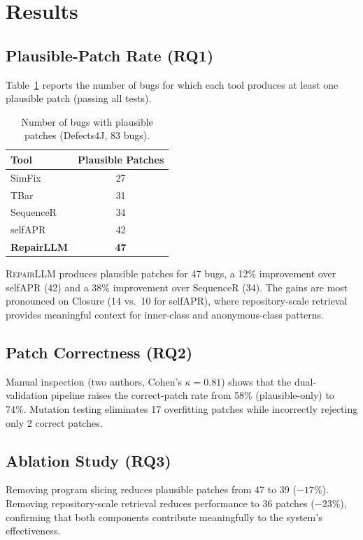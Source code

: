 \section{Results}

\subsection{Plausible-Patch Rate (RQ1)}

Table~\ref{tab:results} reports the number of bugs for which each tool
produces at least one plausible patch (passing all tests).

\begin{table}[!t]
\centering
\small
\caption{Number of bugs with plausible patches (Defects4J, 83 bugs).}
\label{tab:results}
\begin{tabular}{@{}lc@{}}
\toprule
\textbf{Tool} & \textbf{Plausible Patches} \\
\midrule
SimFix         & 27 \\
TBar           & 31 \\
SequenceR      & 34 \\
selfAPR        & 42 \\
\textbf{RepairLLM} & \textbf{47} \\
\bottomrule
\end{tabular}
\end{table}

\textsc{RepairLLM} produces plausible patches for 47 bugs, a 12\%
improvement over selfAPR (42) and a 38\% improvement over SequenceR (34).
The gains are most pronounced on Closure (14 vs.\ 10 for selfAPR), where
repository-scale retrieval provides meaningful context for inner-class and
anonymous-class patterns.

\subsection{Patch Correctness (RQ2)}

Manual inspection (two authors, Cohen's $\kappa = 0.81$) shows that the
dual-validation pipeline raises the correct-patch rate from 58\%
(plausible-only) to 74\%. Mutation testing eliminates 17 overfitting
patches while incorrectly rejecting only 2 correct patches.

\subsection{Ablation Study (RQ3)}

Removing program slicing reduces plausible patches from 47 to 39
($-17\%$). Removing repository-scale retrieval reduces performance to
36 patches ($-23\%$), confirming that both components contribute
meaningfully to the system's effectiveness.

